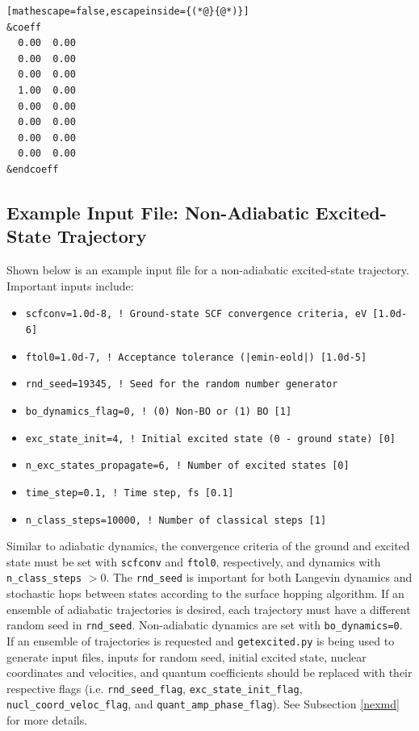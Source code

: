 \documentclass[letterpaper,12pt,titlepage]{article}
\begin{document}
\begin{appendix}
\begin{lstlisting}[mathescape=false,escapeinside={(*@}{@*)}]
&coeff
  0.00  0.00
  0.00  0.00
  0.00  0.00
  1.00  0.00
  0.00  0.00
  0.00  0.00
  0.00  0.00
  0.00  0.00
&endcoeff
\end{lstlisting}
\newpage
\subsection{Example Input File: Non-Adiabatic Excited-State Trajectory}
\label{input_nexmd}
Shown below is an example input file for a non-adiabatic excited-state trajectory.  Important inputs include:
\begin{itemize}
\item \verb+scfconv=1.0d-8, ! Ground-state SCF convergence criteria, eV [1.0d-6]+
\item \verb+ftol0=1.0d-7, ! Acceptance tolerance (|emin-eold|) [1.0d-5]+
\item \verb+rnd_seed=19345, ! Seed for the random number generator+
\item \verb+bo_dynamics_flag=0, ! (0) Non-BO or (1) BO [1]+
\item \verb+exc_state_init=4, ! Initial excited state (0 - ground state) [0]+
\item \verb+n_exc_states_propagate=6, ! Number of excited states [0]+
\item \verb+time_step=0.1, ! Time step, fs [0.1]+
\item \verb+n_class_steps=10000, ! Number of classical steps [1]+
\end{itemize}
Similar to adiabatic dynamics, the convergence criteria of the ground and excited state must be set with \verb+scfconv+ and \verb+ftol0+, respectively, and dynamics with \verb+n_class_steps+ $>0$.  The \verb+rnd_seed+ is important for both Langevin dynamics and stochastic hops between states according to the surface hopping algorithm.\cite{tully1990molecular}  If an ensemble of adiabatic trajectories is desired, each trajectory must have a different random seed in \verb+rnd_seed+.  Non-adiabatic dynamics are set with \verb+bo_dynamics=0+.  If an ensemble of trajectories is requested and \verb+getexcited.py+ is being used to generate input files, inputs for random seed, initial excited state, nuclear coordinates and velocities, and quantum coefficients should be replaced with their respective flags (i.e. \verb+rnd_seed_flag+, \verb+exc_state_init_flag+, \verb+nucl_coord_veloc_flag+, and \verb+quant_amp_phase_flag+).  See Subsection \ref{nexmd} for more details.


\end{appendix}
\end{document}
